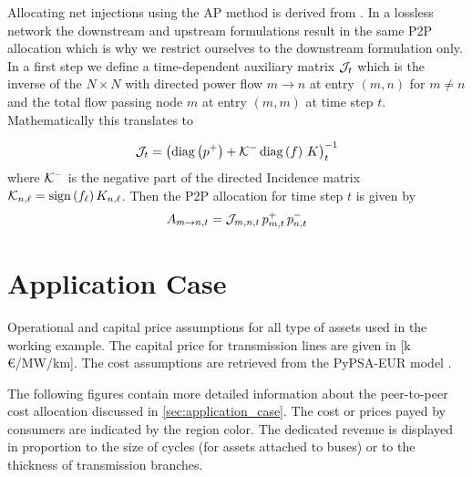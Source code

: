 \documentclass[11pt,twocolumn]{article}
\newcommand{\netconsumption}[1][n]{p^{-}_{#1,t}}
\newcommand{\netproduction}[1][n]{p^{+}_{#1,t}}
\newcommand{\incidence}[1][n]{K_{#1,\ell}}
\newcommand{\allocatepeer}[1][m \rightarrow n]{A_{#1,t}}
\begin{document}
Allocating net injections using the AP method is derived from \cite{achayuthakan_electricity_2010}. In a lossless network the downstream and upstream formulations result in the same P2P allocation which is why we restrict ourselves to the downstream formulation only. In a first step we define a time-dependent auxiliary matrix $\mathcal{J}_t$ which is the inverse of the $N\times N$ with directed power flow $m \rightarrow n$ at entry $(m, n)$ for $m \ne n$ and the total flow passing node $m$ at entry $\left( m, m\right)$ at time step $t$. Mathematically this translates to


\begin{align}
\mathcal{J}_t = \left( \operatorname{diag}\left(p^+\right) + \mathcal{K}^- \operatorname{diag}\left(f\right) \, K \right)_t^{-1} 
\end{align}
where $\mathcal{K}^-$ is the negative part of the directed Incidence matrix $\DirectedIncidence_{n,\ell} = \text{sign}\left( f_\ell \right)  \incidence$. Then the P2P allocation for time step $t$ is given by
\begin{align}
\allocatepeer = \InverseAPInjection_{m,n,t} \, \netproduction[m] \, \netconsumption
\end{align}

\newpage
\section{Application Case}
\label{sec:application_case_appendix}

\begin{table}[h]
    \centering
        
    \caption{Operational and capital price assumptions for all type of assets used in the working example. The capital price for transmission lines are given in [k\,\euro/MW/km]. The cost assumptions are retrieved from the PyPSA-EUR model \cite{horsch_jonas_pypsa-eur_2020}.}
    \label{tab:cost_assumptions}
\end{table} 


The following figures contain more detailed information about the peer-to-peer cost allocation discussed in \cref{sec:application_case}. The cost or prices payed by consumers are indicated by the region color. The dedicated revenue is displayed in proportion to the size of cycles (for assets attached to buses) or to the thickness of transmission branches.    
\end{document}
